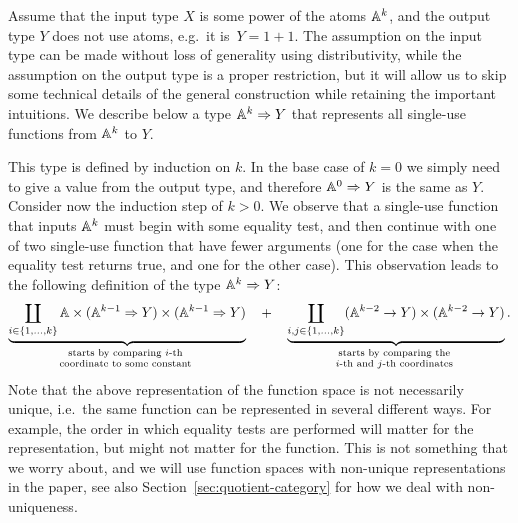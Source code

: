 \begin{example}\label{ex:decision-tree-types} Assume that the input type $X$ is some power of the atoms $\mathbb A^k$, and the output type $Y$ does not use atoms, e.g.~it is~$Y = 1 +1$. The assumption on the input type can be made without loss of generality using distributivity, while the assumption on the output type is a proper restriction, but it will allow us to skip some technical details of the general construction while retaining the important intuitions. 
We describe below a type $\mathbb A^k \Rightarrow Y$ that represents all single-use functions from $\mathbb A^k$ to $Y$. 

This type is defined by  induction on $k$. In the base case of $k=0$ we simply need to give a value from the output type, and therefore $\mathbb A^0 \Rightarrow Y$ is the same as $Y$. Consider now the induction step of $k > 0$.  
    We observe that a single-use function that inputs $\mathbb A^k$ must begin with some equality test, and then continue with one of two single-use function that have fewer arguments (one for the case when the equality test returns true, and one for the other case). This observation leads to the following definition of the type $\mathbb A^k \Rightarrow Y$:
\begin{align*}
\myunderbrace{ \coprod_{i \in \set{1,\ldots,k}} 
    \atoms \times (\atoms^{k-1} \Rightarrow Y) \times (\atoms^{k-1} \Rightarrow Y)
 }{starts by comparing $i$-th  \\
 coordinate to some constant}  \quad + \quad 
\myunderbrace{\coprod_{i, j \in \set{1,\ldots,k}} (\atoms^{k-2} \to Y) \times (\atoms^{k-2} \to Y)}{
    starts by comparing the \\ 
    $i$-th and $j$-th coordinates}.
\end{align*}
Note that the above representation of the function space is not necessarily unique, i.e.~the same function can be represented in several different ways. For example, the order in which equality tests are performed will matter for the representation, but might not matter for the function. This is not something that we worry about, and we will use function spaces with non-unique representations in the paper, see also Section~\ref{sec:quotient-category} for how we deal with non-uniqueness. \exampleend
\end{example}


